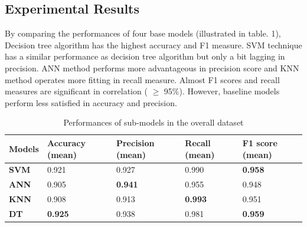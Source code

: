 \documentclass[10pt,journal,compsoc]{IEEEtran}
\begin{document}
\subsection{Experimental Results}
By comparing the performances of four base models (illustrated in table. 1), Decision tree algorithm has the highest accuracy and F1 measure. SVM technique has a similar performance as decision tree algorithm but only a bit lagging in precision. ANN method performs more advantageous in precision score and KNN method operates more fitting in recall measure. Almost F1 scores and recall measures are significant in correlation ( $\geq$ 95\%). However, baseline models perform less satisfied in accuracy and precision. 
\begin{table}[ht]
\begin{tabular}{|C{2cm}|C{2cm}|C{2cm}|C{2cm}|C{2cm}|}
\hline
{} 
{\color[HTML]{333333} \textbf{Models}} & {\color[HTML]{333333} \textbf{Accuracy (mean)}} & {\color[HTML]{333333} \textbf{Precision (mean)}} & {\color[HTML]{333333} \textbf{Recall (mean)}} & {\color[HTML]{333333} \textbf{F1 score (mean)}} \\ \hline
{} 
\textbf{SVM}  & 0.921  & 0.927 & 0.990  & \textbf{0.958}  \\ \hline
{} 
\textbf{ANN} & 0.905 & \textbf{0.941} & 0.955 & 0.948 \\ \hline
{} 
\textbf{KNN}  & 0.908   & 0.913  & \textbf{0.993}  & 0.951  \\ \hline
{} 
\textbf{DT} & \textbf{0.925}  & 0.938 & 0.981  & \textbf{0.959}  \\ \hline
\end{tabular}
\caption{Performances of sub-models in the overall dataset}
\label{submodels}
\end{table}
\end{document}
